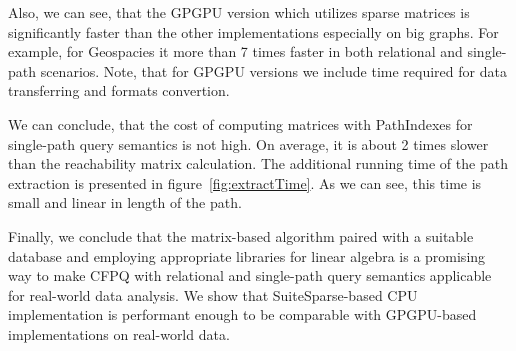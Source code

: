 Also, we can see, that the GPGPU version which utilizes sparse matrices is significantly faster than the other implementations especially on big graphs. For example, for Geospacies it more than 7 times faster in both relational and single-path scenarios.
Note, that for GPGPU versions we include time required for data transferring and formats convertion.

We can conclude, that the cost of computing matrices with PathIndexes for single-path query semantics is not high. On average, it is about 2 times slower than the reachability matrix calculation. The additional running time of the path extraction is presented in figure~\ref{fig:extractTime}. As we can see, this time is small and linear in length of the path.

Finally, we conclude that the matrix-based algorithm paired with a suitable database and employing appropriate libraries for linear algebra is a promising way to make CFPQ with relational and single-path query semantics applicable for real-world data analysis.
We show that SuiteSparse-based CPU implementation is performant enough to be comparable with GPGPU-based implementations on real-world data.



